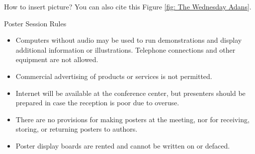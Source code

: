 \documentclass[final]{beamer}
\newlength{\colwidth}
\begin{document}
\begin{frame}[t]
\begin{columns}[t]
\begin{column}{\colwidth}
\begin{block}{How to insert picture?}
You can also cite this Figure \ref{fig: The Wednesday Adans}.
  \end{block}

  \begin{block}{Poster Session Rules}

\begin{itemize}

   \item Computers without audio may be used to run demonstrations and display additional information or illustrations. Telephone connections and other equipment are not allowed.
\item Commercial advertising of products or services is not permitted.
\item Internet will be available at the conference center, but presenters should be prepared in case the reception is poor due to overuse.
\item There are no provisions for making posters at the meeting, nor for receiving, storing, or returning posters to authors.
\item Poster display boards are rented and cannot be written on or defaced.
\end{itemize}

   

  \end{block}


\end{column}
\end{columns}
\end{frame}
\end{document}
